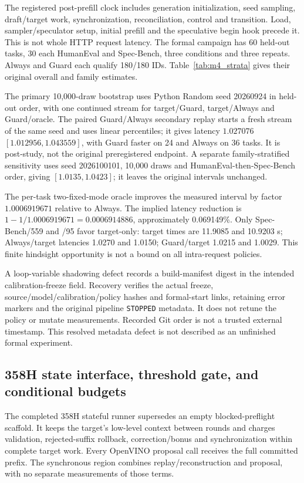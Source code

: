 The registered post-prefill clock includes generation initialization, seed sampling, draft/target work, synchronization, reconciliation, control and transition. Load, sampler/speculator setup, initial prefill and the speculative begin hook precede it. This is not whole HTTP request latency. The formal campaign has 60 held-out tasks, 30 each HumanEval and Spec-Bench, three conditions and three repeats. Always and Guard each qualify 180/180 IDs. Table~\ref{tab:m4_strata} gives their original overall and family estimates.



The primary 10,000-draw bootstrap uses Python Random seed 20260924 in held-out order, with one continued stream for target/Guard, target/Always and Guard/oracle. The paired Guard/Always secondary replay starts a fresh stream of the same seed and uses linear percentiles; it gives latency $1.027076$ $[1.012956,1.043559]$, with Guard faster on 24 and Always on 36 tasks. It is post-study, not the original preregistered endpoint. A separate family-stratified sensitivity uses seed 2026100101, 10,000 draws and HumanEval-then-Spec-Bench order, giving $[1.0135,1.0423]$; it leaves the original intervals unchanged.

The per-task two-fixed-mode oracle improves the measured interval by factor $1.0006919671$ relative to Always. The implied latency reduction is $1-1/1.0006919671=0.0006914886$, approximately 0.069149\%. Only Spec-Bench/559 and /95 favor target-only: target times are 11.9085 and 10.9203 s; Always/target latencies 1.0270 and 1.0150; Guard/target 1.0215 and 1.0029. This finite hindsight opportunity is not a bound on all intra-request policies.

A loop-variable shadowing defect records a build-manifest digest in the intended calibration-freeze field. Recovery verifies the actual freeze, source/model/calibration/policy hashes and formal-start links, retaining error markers and the original pipeline \texttt{STOPPED} metadata. It does not retune the policy or mutate measurements. Recorded Git order is not a trusted external timestamp. This resolved metadata defect is not described as an unfinished formal experiment.

\subsection{358H state interface, threshold gate, and conditional budgets}
The completed 358H stateful runner supersedes an empty blocked-preflight scaffold. It keeps the target's low-level context between rounds and charges validation, rejected-suffix rollback, correction/bonus and synchronization within complete target work. Every OpenVINO proposal call receives the full committed prefix. The synchronous region combines replay/reconstruction and proposal, with no separate measurements of those terms.

